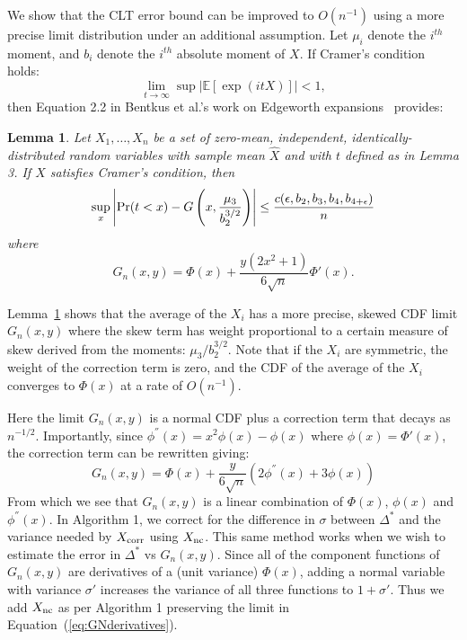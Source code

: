 \documentclass[letterpaper]{article}
\newcommand{\mE}{\mathbb{E}}
\newtheorem{lemma}{Lemma}
\begin{document}
We show that the CLT error bound can be improved to $O(n^{-1})$ using a more
precise limit distribution under an additional assumption. Let $\mu_i$ denote
the $i^{th}$ moment, and $b_i$ denote the $i^{th}$ absolute moment of $X$. If
Cramer's condition holds:
\begin{equation}\label{eq:cramers_condition}
    \lim_{t \to \infty} \sup |\mE[\exp(i t X)]| < 1,
\end{equation}
then Equation 2.2 in Bentkus et al.'s work on Edgeworth
expansions~\citep{Bentkus97} provides:

\begin{lemma}\label{lem:clt_edgeworth}
Let $X_1,\ldots,X_n$ be a set of zero-mean, independent, identically-distributed
random variables with sample mean $\hat{X}$ and with $t$ defined as in Lemma 3.
If $X$ satisfies Cramer's condition, then
\[
    \sup_x\left|{\rm Pr}(t<x) - G\left(x, \frac{\mu_3}{b_2^{3/2}}\right)\right| \leq \frac{c(\epsilon,b_2,b_3,b_4,b_{4+\epsilon})}{n}
\]
where
\begin{equation}
    G_n(x,y) = \Phi(x) + \frac{y(2x^2+1)}{6\sqrt{n}}\Phi'(x).
\end{equation}
\end{lemma}
Lemma~\ref{lem:clt_edgeworth} shows that the average of the $X_i$ has a more
precise, skewed CDF limit $G_n(x,y)$ where the skew term has weight proportional
to a certain measure of skew derived from the moments:
$\mu_3/b_2^{3/2}$. Note that if the $X_i$ are symmetric, the weight of
the correction term is zero, and the CDF of the average of the $X_i$ converges
to $\Phi(x)$ at a rate of $O(n^{-1})$.

Here the limit $G_n(x,y)$ is a normal CDF plus a correction term that decays as
$n^{-1/2}$.
Importantly, since $\phi^{''}(x) = x^2\phi(x) - \phi(x)$ where
$\phi(x)=\Phi'(x)$, the correction term can be rewritten giving:
\begin{equation}\label{eq:GNderivatives}
    G_n(x,y) = \Phi(x) + \frac{y}{6\sqrt{n}}(2\phi^{''}(x)+3\phi(x))
\end{equation}
From which we see that $G_n(x,y)$ is a linear combination of $\Phi(x)$,
$\phi(x)$ and $\phi^{''}(x)$. In Algorithm 1, we
correct for the difference in $\sigma$ between $\Delta^*$ and the variance
needed by $X_{\rm corr}$ using $X_{\rm nc}$. This same method works when we
wish to estimate the error in $\Delta^*$ vs $G_n(x,y)$. Since all of the
component functions of $G_n(x,y)$ are derivatives of a (unit variance)
$\Phi(x)$, adding a normal variable with variance $\sigma'$ increases the
variance of all three functions to $1+\sigma'$. Thus we add $X_{\rm nc}$ as
per Algorithm 1 preserving the limit in Equation~(\ref{eq:GNderivatives}).
\end{document}
